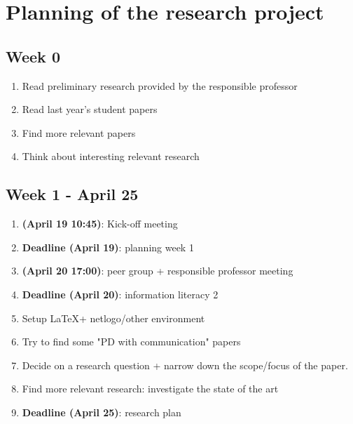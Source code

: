 \documentclass[english]{article}
\begin{document}



\section*{Planning of the research project}


\subsection*{Week 0}

\begin{enumerate}
\item Read preliminary research provided by the responsible professor
\item Read last year's student papers
\item Find more relevant papers
\item Think about interesting relevant research
\end{enumerate}

\subsection*{Week 1 - April 25}
\begin{enumerate}
\item \textbf{(April 19 10:45)}: Kick-off meeting
\item \textbf{Deadline (April 19)}: planning week 1
\item \textbf{(April 20 17:00)}: peer group + responsible professor meeting
\item \textbf{Deadline (April 20)}: information literacy 2
\item Setup \LaTeX + netlogo/other  environment
\item Try to find some "PD with communication" papers
\item Decide on a research question + narrow down the scope/focus of the paper.
\item Find more relevant research: investigate the state of the art
\item \textbf{Deadline (April 25)}: research plan
\end{enumerate}
\end{document}
